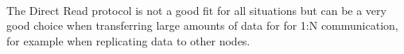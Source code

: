 \paragraph{} The Direct Read protocol is not a good fit for all situations but can be a very good choice when transferring 
large amounts of data for for 1:N communication, for example when replicating data to other nodes. 

